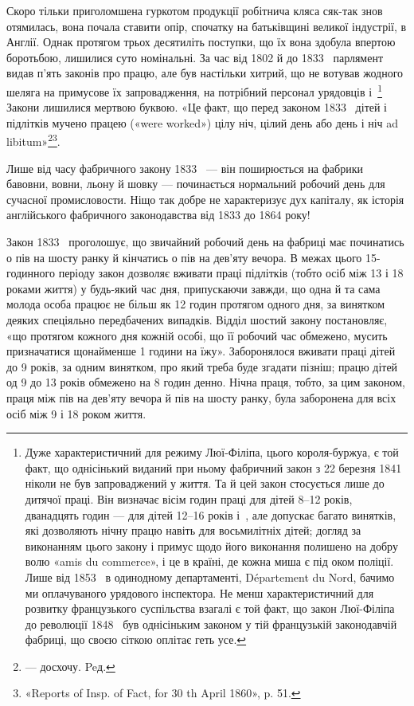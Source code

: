 Скоро тільки приголомшена гуркотом продукції робітнича
кляса сяк-так знов отямилась, вона почала ставити опір, спочатку
на батьківщині великої індустрії, в Англії. Однак протягом
трьох десятиліть поступки, що їх вона здобула впертою боротьбою,
лишилися суто номінальні. За час від 1802 й до 1833~
парлямент видав п’ять законів про працю, але був настільки
хитрий, що не вотував жодного шеляга на примусове їх запровадження,
на потрібний персонал урядовців і~\footnote{
Дуже характеристичний для режиму Люї-Філіпа, цього короля-буржуа,
є той факт, що однісінький виданий при ньому фабричний
закон з 22 березня 1841~ ніколи не був запроваджений у життя. Та й цей
закон стосується лише до дитячої праці. Він визначає вісім годин праці для
дітей 8--12 років, дванадцять годин — для дітей 12--16 років і~, але допускає багато винятків, які дозволяють нічну працю навіть
для восьмилітніх дітей; догляд за виконанням цього закону і примус
щодо його виконання полишено на добру волю «amis du commerce», і це
в країні, де кожна миша є під оком поліції. Лише від 1853~ в одинодному
департаменті, Département du Nord, бачимо ми оплачуваного урядового
інспектора. Не менш характеристичний для розвитку французького
суспільства взагалі є той факт, що закон Люї-Філіпа до революції 1848~
був однісіньким законом у тій французькій законодавчій фабриці, що
своєю сіткою оплітає геть усе.
} Закони лишилися
мертвою буквою. «Це факт, що перед законом 1833~ дітей
і підлітків мучено працею («were worked») цілу ніч, цілий день
або день і ніч ad libitum»\footnote*{
— досхочу. Peд.
}\footnote{
«Reports of Insp. of Fact, for 30 th April 1860», p. 51.
}.

Лише від часу фабричного закону 1833~ — він поширюється
на фабрики бавовни, вовни, льону й шовку — починається нормальний
робочий день для сучасної промисловости. Ніщо так
добре не характеризує дух капіталу, як історія англійського
фабричного законодавства від 1833 до 1864 року!

Закон 1833~ проголошує, що звичайний робочий день на
фабриці має починатись о пів на шосту ранку й кінчатись о пів
на дев’яту вечора. В межах цього 15-годинного періоду закон
дозволяє вживати праці підлітків (тобто осіб між 13 і 18 роками
життя) у будь-який час дня, припускаючи завжди, що одна й
та сама молода особа працює не більш як 12 годин протягом одного
дня, за винятком деяких спеціяльно передбачених випадків. Відділ
шостий закону постановляє, «що протягом кожного дня кожній
особі, що її робочий час обмежено, мусить призначатися щонайменше
1 години на їжу». Заборонялося вживати праці дітей
до 9 років, за одним винятком, про який треба буде згадати пізніш;
працю дітей од 9 до 13 років обмежено на 8 годин денно.
Нічна праця, тобто, за цим законом, праця між пів на дев’яту
вечора й пів на шосту ранку, була заборонена для всіх осіб між
9 і 18 роком життя.

